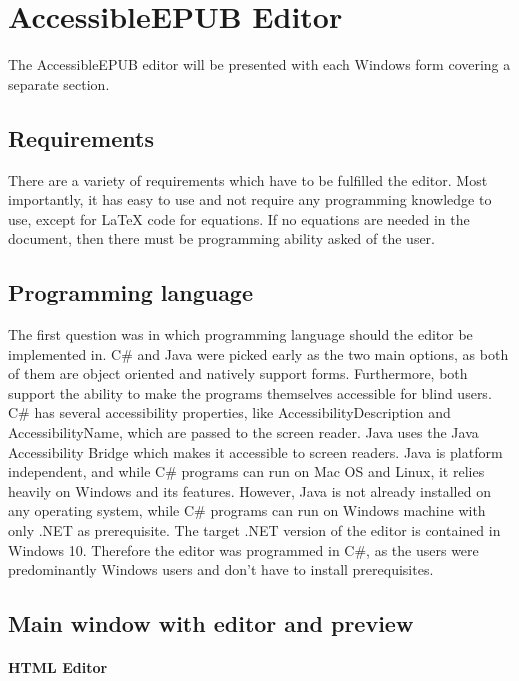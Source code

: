 \chapter{AccessibleEPUB Editor}
\label{ch:AccessibleEPUB Editor}

The AccessibleEPUB editor will be presented with each Windows form covering a separate section.

\section{Requirements}

There are a variety of requirements which have to be fulfilled the editor. Most importantly, it has easy to use and not require any programming knowledge to use, except for LaTeX code for equations. If no equations are needed in the document, then there must be programming ability asked of the user. 

\section{Programming language}

The first question was in which programming language should the editor be implemented in. C\# and Java were picked early as the two main options, as both of them are object oriented and natively support forms. Furthermore, both support the ability to make the programs themselves accessible for blind users. C\# has several accessibility properties, like AccessibilityDescription and AccessibilityName, which are passed to the screen reader. Java uses the Java Accessibility Bridge which makes it accessible to screen readers. Java is platform independent, and while C\# programs can run on Mac OS and Linux, it relies heavily on Windows and its features. However, Java is not already installed on any operating system, while C\# programs can run on Windows machine with only .NET as prerequisite. The target .NET version of the editor is contained in Windows 10. Therefore the editor was programmed in C\#, as the users were predominantly Windows users and don't have to install prerequisites.

\section{Main window with editor and preview}

\subsubsection{HTML Editor}

